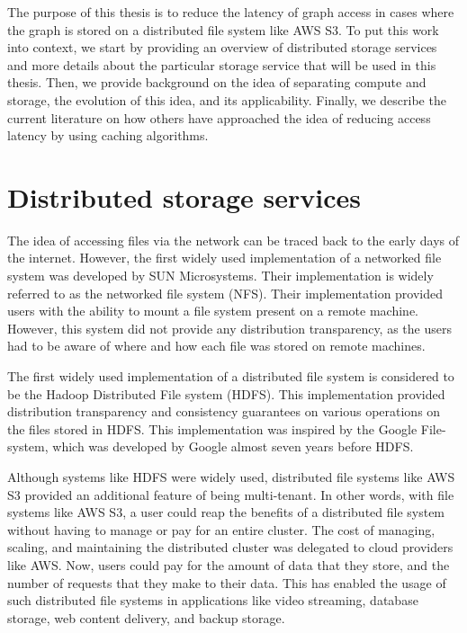 The purpose of this thesis is to reduce the latency of graph access in cases
where the graph is stored on a distributed file system like AWS S3. To
put this work into context, we start by providing an overview of distributed
storage services and more details about the particular storage service that
will be used in this thesis. Then, we provide background on the idea of
separating compute and storage, the evolution of this idea, and its
applicability. Finally, we describe the current literature on how others have
approached the idea of reducing access latency by using caching algorithms.

\section{Distributed storage services}\label{sec:distributedStorage}
The idea of accessing files via the network can be traced back to the early days
of the internet. However, the first widely used implementation of a networked
file system was developed by SUN Microsystems\cite{nfs1986}. Their implementation
is widely referred to as the networked file system (NFS). Their implementation
provided users with the ability to mount a file system present on a remote
machine. However, this system did not provide any distribution transparency, as
the users had to be aware of where and how each file was stored on remote
machines. 

\medskip
The first widely used implementation of a distributed file system is considered
to be the Hadoop Distributed File system (HDFS)\cite{shvachko2010hadoop}. This
implementation provided distribution transparency and consistency guarantees on
various operations on the files stored in HDFS. This implementation was inspired
by the Google File-system\cite{ghemawat2003google}, which was developed by Google
almost seven years before HDFS.

\medskip
Although systems like HDFS were widely used, distributed file systems like AWS
S3\cite{awsS3} provided an additional feature of being multi-tenant. In other
words, with file systems like AWS S3, a user could reap the benefits of a
distributed file system without having to manage or pay for an entire cluster.
The cost of managing, scaling, and maintaining the distributed cluster was
delegated to cloud providers like AWS. Now, users could pay for the amount of
data that they store, and the number of requests that they make to their data.
This has enabled the usage of such distributed file systems in applications like
video streaming, database storage\cite{snowflake}, web content 
delivery, and backup storage.


